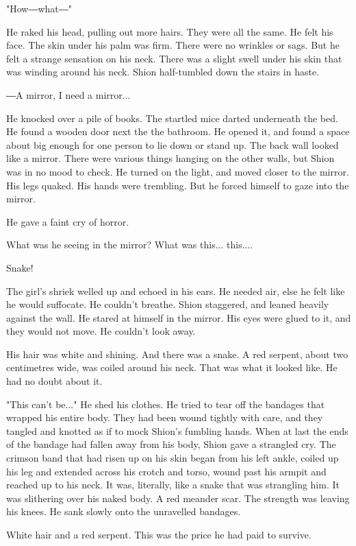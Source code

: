 "How―what―"

He raked his head, pulling out more hairs. They were all the same. He
felt his face. The skin under his palm was firm. There were no wrinkles
or sags. But he felt a strange sensation on his neck. There was a slight
swell under his skin that was winding around his neck. Shion
half-tumbled down the stairs in haste.

―A mirror, I need a mirror...

He knocked over a pile of books. The startled mice darted underneath the
bed. He found a wooden door next the the bathroom. He opened it, and
found a space about big enough for one person to lie down or stand up.
The back wall looked like a mirror. There were various things hanging on
the other walls, but Shion was in no mood to check. He turned on the
light, and moved closer to the mirror. His legs quaked. His hands were
trembling. But he forced himself to gaze into the mirror.

He gave a faint cry of horror.

What was he seeing in the mirror? What was this... this....

Snake!

The girl's shriek welled up and echoed in his ears. He needed air, else
he felt like he would suffocate. He couldn't breathe. Shion staggered,
and leaned heavily against the wall. He stared at himself in the mirror.
His eyes were glued to it, and they would not move. He couldn't look
away.

His hair was white and shining. And there was a snake. A red serpent,
about two centimetres wide, was coiled around his neck. That was what it
looked like. He had no doubt about it.

"This can't be..." He shed his clothes. He tried to tear off the
bandages that wrapped his entire body. They had been wound tightly with
care, and they tangled and knotted as if to mock Shion's fumbling hands.
When at last the ends of the bandage had fallen away from his body,
Shion gave a strangled cry. The crimson band that had risen up on his
skin began from his left ankle, coiled up his leg and extended across
his crotch and torso, wound past his armpit and reached up to his neck.
It was, literally, like a snake that was strangling him. It was
slithering over his naked body. A red meander scar. The strength was
leaving his knees. He sank slowly onto the unravelled bandages.

White hair and a red serpent. This was the price he had paid to survive.

